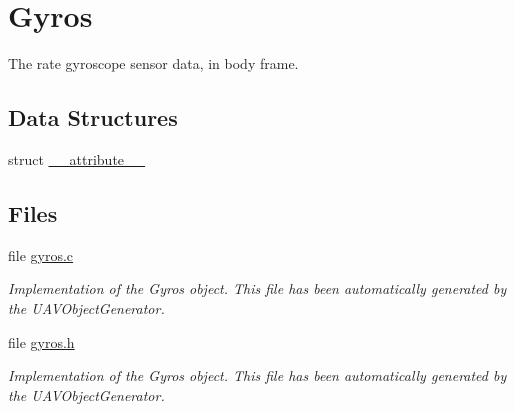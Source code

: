 \hypertarget{group___gyros}{\section{\-Gyros}
\label{group___gyros}
}


\-The rate gyroscope sensor data, in body frame.  


\subsection*{\-Data \-Structures}
\begin{DoxyCompactItemize}
\item 
struct \hyperlink{struct____attribute____}{\-\_\-\-\_\-attribute\-\_\-\-\_\-}
\end{DoxyCompactItemize}
\subsection*{\-Files}
\begin{DoxyCompactItemize}
\item 
file \hyperlink{gyros_8c}{gyros.\-c}
\begin{DoxyCompactList}\small\item\em \-Implementation of the \-Gyros object. \-This file has been automatically generated by the \-U\-A\-V\-Object\-Generator. \end{DoxyCompactList}\item 
file \hyperlink{gyros_8h}{gyros.\-h}
\begin{DoxyCompactList}\small\item\em \-Implementation of the \-Gyros object. \-This file has been automatically generated by the \-U\-A\-V\-Object\-Generator. \end{DoxyCompactList}\end{DoxyCompactItemize}
